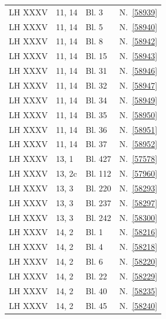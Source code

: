 \begin{longtable}{llll}
LH XXXV & 11, 14 & Bl. 3\textendash 4 & N.~\ref{58939}\\

LH XXXV & 11, 14 & Bl. 5\textendash 6 & N.~\ref{58940}\\

LH XXXV & 11, 14 & Bl. 8 & N.~\ref{58942}\\

LH XXXV & 11, 14 & Bl. 15 & N.~\ref{58943}\\

LH XXXV & 11, 14 & Bl. 31 & N.~\ref{58946}\\

LH XXXV & 11, 14 & Bl. 32 & N.~\ref{58947}\\

LH XXXV & 11, 14 & Bl. 34 & N.~\ref{58949}\\

LH XXXV & 11, 14 & Bl. 35 & N.~\ref{58950}\\

LH XXXV & 11, 14 & Bl. 36 & N.~\ref{58951}\\

LH XXXV & 11, 14 & Bl. 37 & N.~\ref{58952}\\


LH XXXV & 13, 1 & Bl. 427 & N.~\ref{57578}\\

LH XXXV & 13, 2c & Bl. 112\textendash 113 & N.~\ref{57960}\\

LH XXXV & 13, 3 & Bl. 220\textendash 221 & N.~\ref{58293}\\

LH XXXV & 13, 3 & Bl. 237\textendash 238 & N.~\ref{58297}\\

LH XXXV & 13, 3 & Bl. 242 & N.~\ref{58300}\\

LH XXXV & 14, 2 & Bl. 1 & N.~\ref{58216}\\

LH XXXV & 14, 2 & Bl. 4 & N.~\ref{58218}\\

LH XXXV & 14, 2 & Bl. 6 & N.~\ref{58220}\\

LH XXXV & 14, 2 & Bl. 22\textendash 23 & N.~\ref{58229}\\

LH XXXV & 14, 2 & Bl. 40 & N.~\ref{58235}\\

LH XXXV & 14, 2 & Bl. 45 & N.~\ref{58240}\\


\end{longtable}
